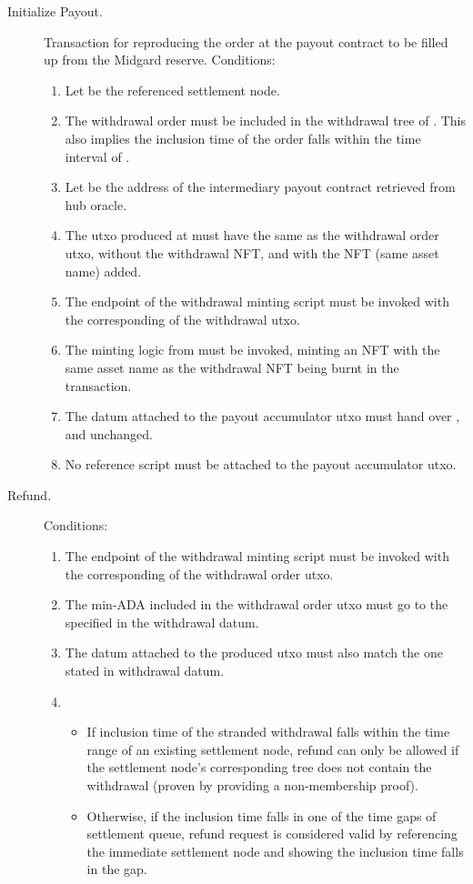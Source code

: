 \documentclass[../midgard.tex]{subfiles}
\begin{document}
\begin{description}
  \item[Initialize Payout.] Transaction for reproducing the order at the payout contract to be filled up from the Midgard reserve.
    Conditions:
    \begin{enumerate}
      \item Let  be the referenced settlement node.
      \item The withdrawal order must be included in the withdrawal tree of .
        This also implies the inclusion time of the order falls within the time interval of .
      \item Let  be the address of the intermediary payout contract retrieved from hub oracle.
      \item The utxo produced at  must have the same  as the withdrawal order utxo, without the withdrawal NFT, and with the  NFT (same asset name) added.
      \item The  endpoint of the withdrawal minting script must be invoked with the corresponding  of the withdrawal utxo.
      \item The minting logic from  must be invoked, minting an NFT with the same asset name as the withdrawal NFT being burnt in the transaction.
      \item The datum attached to the payout accumulator utxo must hand over ,  and  unchanged.
      \item No reference script must be attached to the payout accumulator utxo.
    \end{enumerate}
  \item[Refund.] 
    Conditions:
    \begin{enumerate}
      \item The  endpoint of the withdrawal minting script must be invoked with the corresponding  of the withdrawal order utxo.
      \item The min-ADA included in the withdrawal order utxo must go to the  specified in the withdrawal datum.
      \item The datum attached to the produced utxo must also match the one stated in withdrawal datum.
      \item 
        \begin{itemize}
          \item If inclusion time of the stranded withdrawal falls within the time range of an existing settlement node, refund can only be allowed if the settlement node's corresponding tree does not contain the withdrawal (proven by providing a non-membership proof).
          \item Otherwise, if the inclusion time falls in one of the time gaps of settlement queue, refund request is considered valid by referencing the immediate settlement node and showing the inclusion time falls in the gap.
        \end{itemize}
    \end{enumerate}
\end{description}
\end{document}

